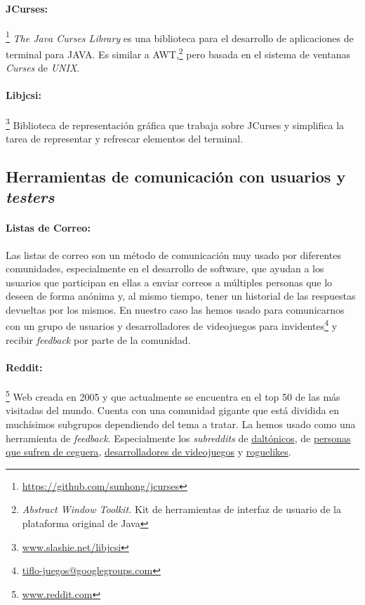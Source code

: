 \paragraph{JCurses:}\footnote{\url{https://github.com/sunhong/jcurses}} \textit{The Java Curses Library} es una biblioteca para el desarrollo de aplicaciones de terminal para JAVA. Es similar a AWT,\footnote{\textit{Abstract Window Toolkit.} Kit de herramientas de interfaz de usuario de la plataforma original de Java} pero basada en el sistema de ventanas \textit{Curses} de \textit{UNIX}.

\paragraph{Libjcsi:}\footnote{\url{www.slashie.net/libjcsi}} Biblioteca de representación gráfica que trabaja sobre JCurses y simplifica la tarea de representar y refrescar elementos del terminal.

\subsection{Herramientas de comunicación con usuarios y \textit{testers}}

\paragraph{Listas de Correo:} Las listas de correo son un método de comunicación muy usado por diferentes comunidades, especialmente en el desarrollo de software, que ayudan a los usuarios que participan en ellas a enviar correos a múltiples personas que lo deseen de forma anónima y, al mismo tiempo, tener un historial de las respuestas devueltas por los mismos. En nuestro caso las hemos usado para comunicarnos con un grupo de usuarios y desarrolladores de videojuegos para invidentes\footnote{\url{tiflo-juegos@googlegroups.com}} y recibir \textit{feedback} por parte de la comunidad.

 \paragraph{Reddit:}\footnote{\url{www.reddit.com}} Web creada en 2005 y que actualmente se encuentra en el top 50 de las más visitadas del mundo. Cuenta con una comunidad gigante que está dividida en muchísimos subgrupos dependiendo del tema a tratar. La hemos usado como una herramienta de \textit{feedback}. Especialmente los \textit{subreddits} de \href{https://www.reddit.com/r/ColorBlind/}{daltónicos}, de \href{https://www.reddit.com/r/blind/}{personas que sufren de ceguera}, \href{https://www.reddit.com/r/gamedev/}{desarrolladores de videojuegos} y \href{https://www.reddit.com/r/roguelikes/}{roguelikes}.
